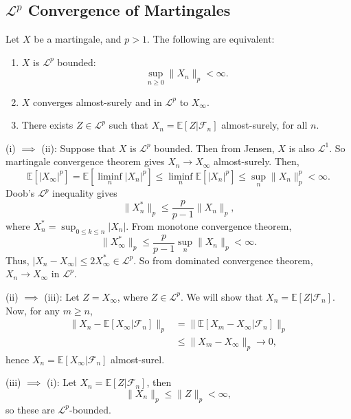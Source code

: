 \documentclass[12pt]{article}
\begin{document}
\subsection{\texorpdfstring{$\mathcal{L}^p$}{Lp} Convergence of Martingales}%
\label{sub:lp_conv_mg}

\begin{theorem}
	Let $X$ be a martingale, and $p > 1$. The following are equivalent:
	\begin{enumerate}[\normalfont(i)]
		\item $X$ is $\mathcal{L}^p$ bounded:
			\[
			\sup_{n \geq 0} \|X_n\|_p < \infty.
			\]
		\item $X$ converges almost-surely and in $\mathcal{L}^p$ to $X_\infty$.
		\item There exists $Z \in \mathcal{L}^p$ such that $X_n = \mathbb{E}[Z|\mathcal{F}_n]$ almost-surely, for all $n$.
	\end{enumerate}
\end{theorem}

\begin{proofbox}
	

	(i) $\implies$ (ii): Suppose that $X$ is $\mathcal{L}^p$ bounded. Then from Jensen, $X$ is also $\mathcal{L}^1$. So martingale convergence theorem gives $X_n \to X_\infty$ almost-surely. Then,
	\[
	\mathbb{E}[|X_\infty|^p] = \mathbb{E}[\liminf_n |X_n|^p] \leq \liminf_n \mathbb{E}[|X_n|^p] \leq \sup_n \|X_n\|_p^p < \infty.
	\]
	Doob's $\mathcal{L}^p$ inequality gives
	\[
	\|X_n^\ast\|_p \leq \frac{p}{p-1} \|X_n\|_p,
	\]
	where $X_n^\ast = \sup_{0 \leq k \leq n} |X_n|$. From monotone convergence theorem,
	\[
	\|X_\infty^\ast\|_p \leq \frac{p}{p-1} \sup_n \|X_n\|_p < \infty.
	\]
	Thus, $|X_n - X_\infty| \leq 2 X_\infty^\ast \in \mathcal{L}^p$. So from dominated convergence theorem, $X_n \to X_\infty$ in $\mathcal{L}^p$.

	(ii) $\implies$ (iii): Let $Z = X_\infty$, where $Z \in \mathcal{L}^p$. We will show that $X_n = \mathbb{E}[Z|\mathcal{F}_n]$. Now, for any $m \geq n$,
	\begin{align*}
		\|X_n - \mathbb{E}[X_\infty|\mathcal{F}_n]\|_p &= \|\mathbb{E}[X_m - X_\infty | \mathcal{F}_n]\|_p \\
							       &\leq \|X_m - X_\infty\|_p \to 0,
	\end{align*}
	hence $X_n = \mathbb{E}[X_\infty | \mathcal{F}_n]$ almost-surel.


	(iii) $\implies$ (i): Let $X_n = \mathbb{E}[Z | \mathcal{F}_n]$, then
	\[
	\|X_n\|_p \leq \|Z\|_p < \infty,
	\]
	so these are $\mathcal{L}^p$-bounded.
\end{proofbox}
\end{document}
